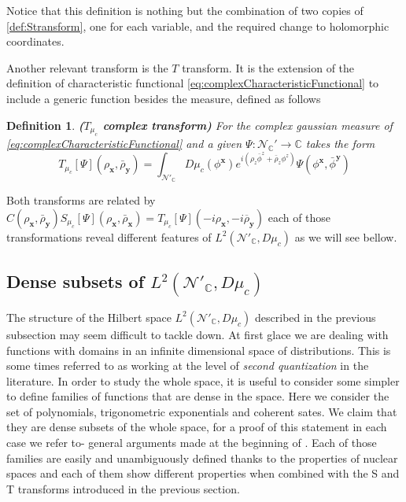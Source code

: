 \documentclass[12pt]{article}%
\newtheorem{definition}{Definition}%
\begin{document}
Notice that this definition is nothing but the combination of two copies of \autoref{def:Stransform}, one for each variable, and the required change to holomorphic coordinates.

Another relevant transform is the $T$ transform. It is the  extension of  the definition of characteristic functional \eqref{eq:complexCharacteristicFunctional} to  include a generic function besides the measure, defined as follows
\begin{definition}
    \label{def:TComplextransform}{\bf ($T_{\mu_c}$ complex transform)} For the complex gaussian measure of \eqref{eq:complexCharacteristicFunctional} and a given $\Psi:\mathcal{N}_{\mathbb{C}}'\to \mathbb{C}$  takes the form 
\begin{equation}
    \label{eq:Ttransform}
    T_{\mu_c}[\Psi](\rho_\mathbf{x},\bar{\rho}_\mathbf{y})=\int_{\mathcal{N}'_\mathbb{C}}D\mu_c(\phi^{\mathbf{x}})e^{i( \rho_z\bar\phi^z+\bar\rho_z\phi^z)} \Psi(\phi^{\mathbf{x}},\bar\phi^\mathbf{y})
    \end{equation}
\end{definition}

\noindent Both transforms are related by $C(\rho_\mathbf{x},\bar{\rho}_\mathbf{y}) S_{\mu_c}[\Psi](\rho_\mathbf{x},\bar\rho_\mathbf{x})= T_{\mu_c}[\Psi](-i\rho_\mathbf{x},-i\overline{\rho}_\mathbf{y})$ each of those transformations reveal  different features of $L^2(\mathcal{N}'_\mathbb{C},D\mu_c)$ as we will see bellow.  


\subsection{Dense subsets of $L^2(\mathcal{N}'_\mathbb{C},D\mu_c)$}

The structure of the  Hilbert space $L^2(\mathcal{N}'_\mathbb{C},D\mu_c)$ described in the previous subsection may seem difficult to tackle down. At first glace we are dealing with functions with domains in an infinite dimensional space of distributions. This is some times referred to as working at the level of {\it second quantization} in the literature. In order to study the whole space, it is useful to consider some simpler to define families of functions that are dense in the space. Here we consider the set of polynomials, trigonometric exponentials and coherent sates. We claim that they are dense subsets of the whole space, for a proof of this statement in each case we refer to- general arguments made at the beginning of  \cite{Hida1993}. Each of those families are easily and unambiguously defined thanks to the properties of nuclear spaces and each of them show different properties when combined with the S and T transforms introduced in the previous section. 
\end{document}
